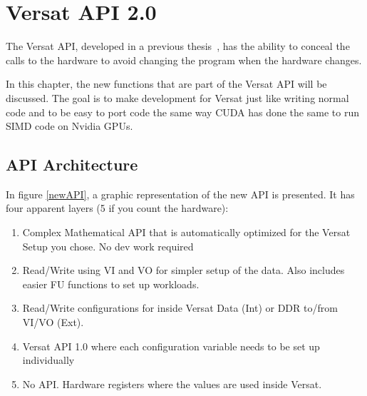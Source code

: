 \chapter{Versat API 2.0}
\label{chapter:API}

The Versat API, developed in a previous thesis~\cite{valter:deepversat}, has the ability to conceal
the calls to the hardware to avoid changing the program when the hardware changes. 

In this chapter, the new functions that are part of the Versat API will be discussed. The goal
is to make development for Versat just like writing normal code and to be easy to port code the same way
CUDA has done the same to run SIMD code on Nvidia GPUs.



\section{API Architecture}

In figure \ref{newAPI}, a graphic representation of the new API is presented. It has four apparent layers (5 if you count the hardware):

\begin{enumerate}
	\item Complex Mathematical API that is automatically optimized for the Versat Setup you chose. No dev work required
	\item Read/Write using VI and VO for simpler setup of the data. Also includes easier FU functions to set up workloads.
	\item Read/Write configurations for inside Versat Data (Int) or DDR to/from VI/VO (Ext).
	\item Versat API 1.0 where each configuration variable needs to be set up individually
	\item No API. Hardware registers where the values are used inside Versat. 
  \end{enumerate}


